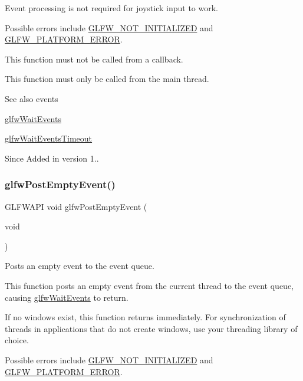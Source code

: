 Event processing is not required for joystick input to work.

Possible errors include \hyperlink{group__errors_ga2374ee02c177f12e1fa76ff3ed15e14a}{G\+L\+F\+W\+\_\+\+N\+O\+T\+\_\+\+I\+N\+I\+T\+I\+A\+L\+I\+Z\+ED} and \hyperlink{group__errors_gad44162d78100ea5e87cdd38426b8c7a1}{G\+L\+F\+W\+\_\+\+P\+L\+A\+T\+F\+O\+R\+M\+\_\+\+E\+R\+R\+OR}.

This function must not be called from a callback.

This function must only be called from the main thread.

\begin{DoxySeeAlso}{See also}
events 

\hyperlink{group__window_ga6e042d05823c11e11c7339b81a237738}{glfw\+Wait\+Events} 

\hyperlink{group__window_ga05223a0a4c5e50f10f289e60398153aa}{glfw\+Wait\+Events\+Timeout}
\end{DoxySeeAlso}
\begin{DoxySince}{Since}
Added in version 1.. 
\end{DoxySince}
\mbox{\label{group__window_gad6f6b997278c91c43b35970eb9713d7e}} 
\subsubsection{\texorpdfstring{glfw\+Post\+Empty\+Event()}{glfwPostEmptyEvent()}}
{\footnotesize\ttfamily G\+L\+F\+W\+A\+PI void glfw\+Post\+Empty\+Event (\begin{DoxyParamCaption}\item[{void}]{ }\end{DoxyParamCaption})}



Posts an empty event to the event queue. 

This function posts an empty event from the current thread to the event queue, causing \hyperlink{group__window_ga6e042d05823c11e11c7339b81a237738}{glfw\+Wait\+Events} to return.

If no windows exist, this function returns immediately. For synchronization of threads in applications that do not create windows, use your threading library of choice.

Possible errors include \hyperlink{group__errors_ga2374ee02c177f12e1fa76ff3ed15e14a}{G\+L\+F\+W\+\_\+\+N\+O\+T\+\_\+\+I\+N\+I\+T\+I\+A\+L\+I\+Z\+ED} and \hyperlink{group__errors_gad44162d78100ea5e87cdd38426b8c7a1}{G\+L\+F\+W\+\_\+\+P\+L\+A\+T\+F\+O\+R\+M\+\_\+\+E\+R\+R\+OR}.

